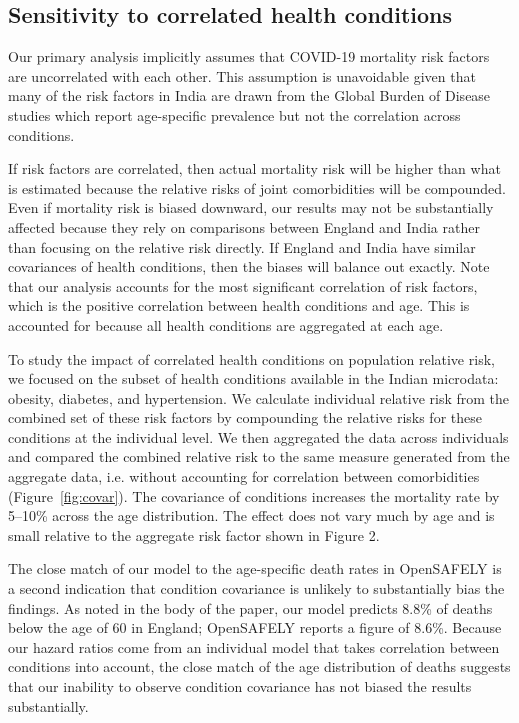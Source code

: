 \documentclass[10pt,letterpaper]{article}
\numberwithin{equation}{section}
\begin{document}
\clearpage
\subsection{Sensitivity to correlated health conditions}

Our primary analysis implicitly assumes that COVID-19 mortality risk factors are uncorrelated with each other. This assumption is unavoidable given that many of the risk factors in India are drawn from the Global Burden of Disease studies which report age-specific prevalence but not the correlation across conditions.

If risk factors are correlated, then actual mortality risk will be higher than what is estimated because the relative risks of joint comorbidities will be compounded. Even if mortality risk is biased downward, our results may not be substantially affected because they rely on comparisons between England and India rather than focusing on the relative risk directly. If England and India have similar covariances of health conditions, then the biases will balance out exactly. Note that our analysis accounts for the most significant correlation of risk factors, which is the positive correlation between health conditions and age. This is accounted for because all health conditions are aggregated at each age.

To study the impact of correlated health conditions on population relative risk, we focused on the subset of health conditions available in the Indian microdata: obesity, diabetes, and hypertension. We calculate individual relative risk from the combined set of these risk factors by compounding the relative risks for these conditions at the individual level. We then aggregated the data across individuals and compared the combined relative risk to the same measure generated from the aggregate data, i.e. without accounting for correlation between comorbidities (Figure~\ref{fig:covar}).
The covariance of conditions increases the mortality rate by 5--10\% across the age distribution. The effect does not vary much by age and is small relative to the aggregate risk factor shown in Figure 2.

The close match of our model to the age-specific death rates in OpenSAFELY is a second indication that condition covariance is unlikely to substantially bias the findings. As noted in the body of the paper, our model predicts 8.8\% of deaths below the age of 60 in England; OpenSAFELY reports a figure of \num{8.6}\%. Because our hazard ratios come from an individual model that takes correlation between conditions into account, the close match of the age distribution of deaths suggests that our inability to observe condition covariance has not biased the results substantially.
\end{document}
